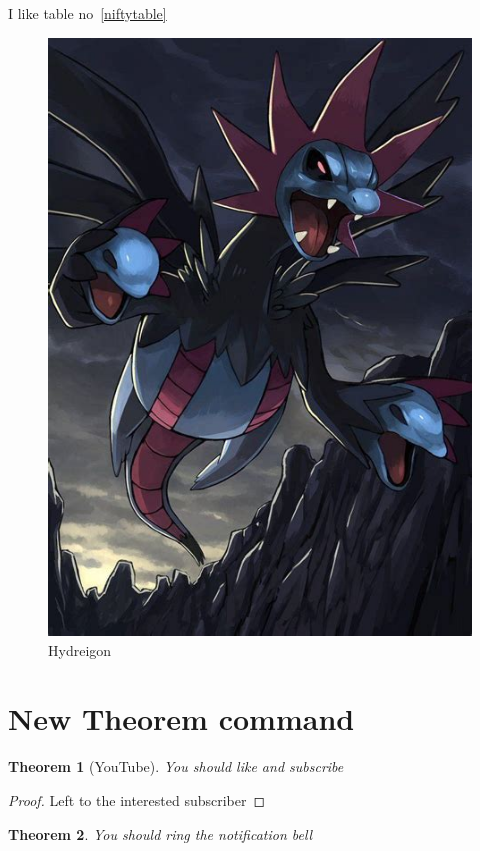 \documentclass{article}
\newtheorem{theorem}{Theorem}[section]
\begin{document}
I like table no~\ref{niftytable}

\newpage



\begin{figure}
    \centering
    \includegraphics[width=\textwidth]{img1}
    \caption{Hydreigon}\label{hydreigon}

\end{figure}


\newpage
\section{New Theorem command}

\begin{theorem}[YouTube]
You should like and subscribe
\end{theorem}
\begin{proof}
Left to the interested subscriber
\end{proof}
\begin{theorem}
You should ring the notification bell
\end{theorem}
\end{document}
